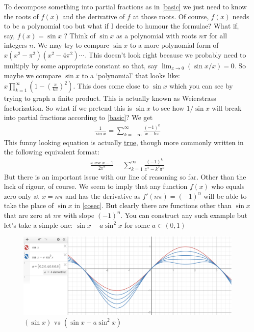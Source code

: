 \documentclass{article}
\begin{document}
To decompose something into partial fractions as in \eqref{basic} we just need to know the roots of $f(x)$ and the derivative of $f$ at those roots. Of course, $f(x)$ needs to be a polynomial too but what if I decide to humour the formulae? What if, say, $f(x) = \sin x$ ?
\newpage
Think of $\sin x$ as a polynomial with roots $n\pi$ for all integers $n$. We may try to compare $\sin x$ to a more polynomial form of $x(x^2-\pi^2)(x^2-4\pi^2)\cdots$. This doesn't look right because we probably need to multiply by some appropriate constant so that, say $\lim_{x\rightarrow 0} (\sin x / x) = 0$. So maybe we compare $\sin x$ to a `polynomial' that looks like: $x \prod_{k=1}^{\infty} \left(1-\left(\frac{x}{k\pi}\right)^2\right)$. This does come close to $\sin x$ which you can see by trying to graph a finite product. This is actually known as Weierstrass factorization. So what if we pretend this is $\sin x$ to see how $1/\sin x$ will break into partial fractions according to \eqref{basic}? We get
\begin{align}
    \frac{1}{\sin x} = \sum_{k = -\infty}^{\infty} \frac{(-1)^k}{x-k\pi} \label{cosec}
\end{align}
This funny looking equation is actually \href{https://en.wikipedia.org/wiki/Trigonometric_functions#Partial_fraction_expansion}{true}, though more commonly written in the following equivalent format:
\begin{align}
     \frac{x\csc x - 1}{2x^2} = \sum_{k=1}^{\infty} \frac{(-1)^k }{x^2-k^2\pi^2}
\end{align}
But there is an important issue with our line of reasoning so far. Other than the lack of rigour, of course. We seem to imply that any function $f(x)$ who equals zero only at $x = n\pi$ and has the derivative as $f'(n\pi) = (-1)^n$ will be able to take the place of $\sin x$ in \eqref{cosec}. But clearly there are functions other than $\sin x$ that are zero at $n\pi$ with slope $(-1)^n$. You can construct any such example but let's take a simple one: $\sin x - a \sin^2 x$ for some $a\in (0,1)$ 

\begin{figure}[h]
    \centering
    \includegraphics[scale=0.35]{sinx.png}
    \caption{$(\sin x)$ vs $(\sin x - a \sin^2 x)$}
\end{figure}
\end{document}
